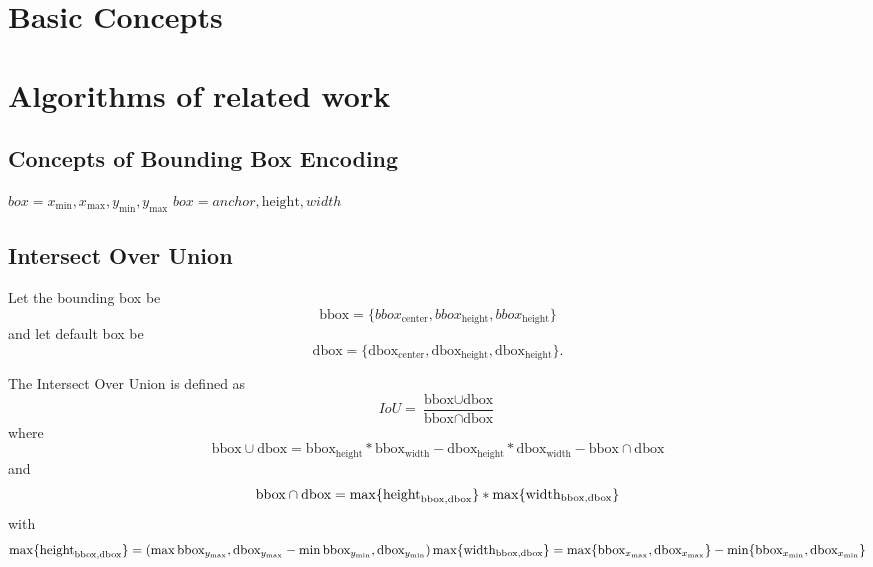 \section{Basic Concepts}
\blindtext[1]

\section{Algorithms of related work}
\blindtext[2]

\subsection{Concepts of Bounding Box Encoding}\label{append:Concepts of Bounding Box Encoding}
\(box = {x_{\text{min}}, x_{\text{max}}, y_{\text{min}}, y_{\text{max}}}\)
\(box = {anchor, \text{height}, width}\)
\blindtext[1]

\subsection{Intersect Over Union}\label{sect:Intersect Over Union}
Let the bounding box be 
\begin{equation}
    \text{bbox}=\{bbox_\text{center}, bbox_{\text{height}}, bbox_\text{height}\}
\end{equation}
and let default box be 
\begin{equation}
    \text{dbox}=\{\text{dbox}_\text{center}, \text{dbox}_\text{height}, \text{dbox}_\text{height}\}.
\end{equation}

The Intersect Over Union is defined as
\begin{equation}
    IoU=\frac{\text{bbox}\cup \text{dbox}}{\text{bbox}\cap \text{dbox}}
\end{equation}
where
\begin{equation}
    \text{bbox}\cup \text{dbox}=\text{bbox}_{\text{height}}*\text{bbox}_{\text{width}} - \text{dbox}_{\text{height}}*\text{dbox}_{\text{width}} - \text{bbox}\cap \text{dbox}
\end{equation}
and
\begin{equation}
   \text{bbox}\cap \text{dbox} = \max\{\text{height}_{\text{bbox}, \text{dbox}}\}*\max\{\text{width}_{\text{bbox}, \text{dbox}}\}\\
\end{equation}
with
\begin{equation}
    \max\{\text{height}_{\text{bbox}, \text{dbox}}\} = (\max{\text{bbox}_{y_\text{max}}, \text{dbox}_{y_\text{max}}}-\min{\text{bbox}_{y_\text{min}}, \text{dbox}_{y_\text{min}}})\\
    \max\{\text{width}_{\text{bbox}, \text{dbox}}\}= \max\{\text{bbox}_{x_\text{max}}, \text{dbox}_{x_\text{max}}\}-\min\{\text{bbox}_{x_\text{min}}, \text{dbox}_{x_\text{min}}\}
\end{equation}

